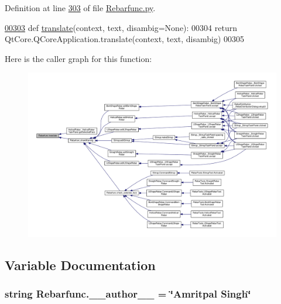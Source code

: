 Definition at line \hyperlink{Rebarfunc_8py_source_l00303}{303} of file \hyperlink{Rebarfunc_8py_source}{Rebarfunc.\+py}.


\begin{DoxyCode}
\hypertarget{namespaceRebarfunc.tex_l00303}{}\hyperlink{namespaceRebarfunc_a1467a55852e36c36c472e222855bb937}{00303} \textcolor{keyword}{def }\hyperlink{namespaceRebarfunc_a1467a55852e36c36c472e222855bb937}{translate}(context, text, disambig=None):
00304     \textcolor{keywordflow}{return} QtCore.QCoreApplication.translate(context, text, disambig)
00305 \end{DoxyCode}


Here is the caller graph for this function\+:\nopagebreak
\begin{figure}[H]
\begin{center}
\leavevmode
\includegraphics[width=350pt]{namespaceRebarfunc_a1467a55852e36c36c472e222855bb937_icgraph}
\end{center}
\end{figure}




\subsection{Variable Documentation}
\subsubsection[{\texorpdfstring{\+\_\+\+\_\+author\+\_\+\+\_\+}{__author__}}]{\setlength{\rightskip}{0pt plus 5cm}string Rebarfunc.\+\_\+\+\_\+author\+\_\+\+\_\+ = \char`\"{}Amritpal Singh\char`\"{}\hspace{0.3cm}{\ttfamily [private]}}\hypertarget{namespaceRebarfunc_aae2a5c81818721137a6cd0f3b66005cb}{}\label{namespaceRebarfunc_aae2a5c81818721137a6cd0f3b66005cb}


